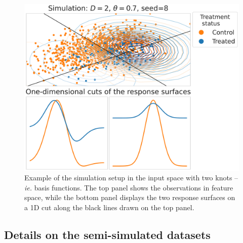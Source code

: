\documentclass[11pt]{article}
\begin{document}
\begin{figure}[!t]
    \centering
    \includegraphics[width=\linewidth]{images/caussim_example_rs_gaussian=8_rs_rotation=8_ntv=0.37_D=2_overlap=0.7_p_A=0.1.pdf}

    \caption{Example of the simulation setup in the input space with two
        knots --\emph{ie.} basis functions. The top panel
        shows the observations in feature space, while the bottom panel displays the
        two response surfaces on a 1D cut along the black lines drawn on
        the top panel.}
    \label{fig:simulation_examples}
\end{figure}


\subsection{ Details on the semi-simulated datasets}\label{apd:experiments:datasets}
\end{document}
